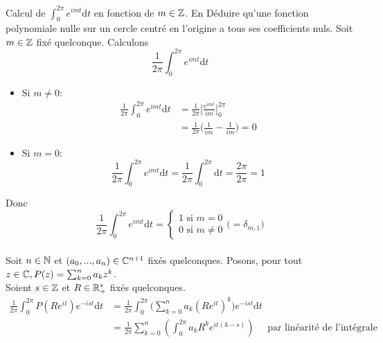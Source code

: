 \documentclass{article}
\renewenvironment{question_kholle}[2][ ]
{
	\subsection{\texorpdfstring{#2}{}}
	\notblank{#1}
	{
		\noindent #1
		\bigbreak
	}
	{}
	\begin{proof}
}
{
	\end{proof}
}
\begin{document}
\begin{question_kholle}{Calcul de $\displaystyle\int_0^{2\pi}e^{imt} \mathrm d t$ en fonction de $m \in \mathbb Z$. En Déduire qu'une fonction polynomiale nulle sur un cercle centré en l'origine a tous ses coefficients nuls.}
	Soit $m \in \mathbb Z$ fixé quelconque. Calculons
	$$\frac{1}{2 \pi} \int_0^{2\pi}e^{imt} \mathrm d t$$
	\begin{itemize}[label=$\star$]
		\item Si $m \neq 0$:
		      \begin{align*}
			      \frac{1}{2 \pi} \int_0^{2\pi}e^{imt} \mathrm d t & = \frac{1}{2 \pi} \Big[ \frac{e^{imt}}{im} \Big]_0^{2\pi}     \\
			                                                       & = \frac{1}{2 \pi} \Big( \frac{1}{im} - \frac{1}{im} \Big) = 0
		      \end{align*}
		\item Si $m = 0$:
		      $$
			      \frac{1}{2 \pi} \int_0^{2\pi}e^{imt} \mathrm d t = \frac{1}{2 \pi} \int_0^{2\pi} \mathrm d t = \frac{2 \pi}{2 \pi} = 1
		      $$
	\end{itemize}
	Donc $$\frac{1}{2 \pi} \int_0^{2\pi}e^{imt} \mathrm d t =
		\begin{cases}
			1 \text{ si } m=0 \\
			0 \text{ si } m \neq 0
		\end{cases}
		\bigl(= \delta_{m, 1}\bigr)
	$$
	\\
	Soit $n\in \mathbb N$ et $(a_0, ..., a_n) \in \mathbb C^{n+1}$ fixés quelconques. Posons, pour tout $z\in\mathbb C, P(z) = \sum_{k=0}^n a_k z^k$.\\
	Soient $s\in\mathbb Z$ et $R\in\mathbb R_+^*$ fixés quelconques.
	\begin{align*}
		\frac{1}{2 \pi} \int_0^{2\pi} P(Re^{it}) e^{-ist} \mathrm d t & = \frac{1}{2 \pi} \int_0^{2\pi} \bigg (\sum_{k=0}^n a_k (Re^{it})^k \bigg) e^{-ist} \mathrm d t                                                                                                                                                                                                                                                     \\
		                                                              & = \frac{1}{2\pi}\sum_{k=0}^{n}\left(\int_{0}^{2\pi}a_kR^ke^{it(k-s)}\right)                                                                                                                                                                                                                               \quad\text{ par linéarité de l'intégrale} \\

\end{align*}
\end{question_kholle}
\end{document}
